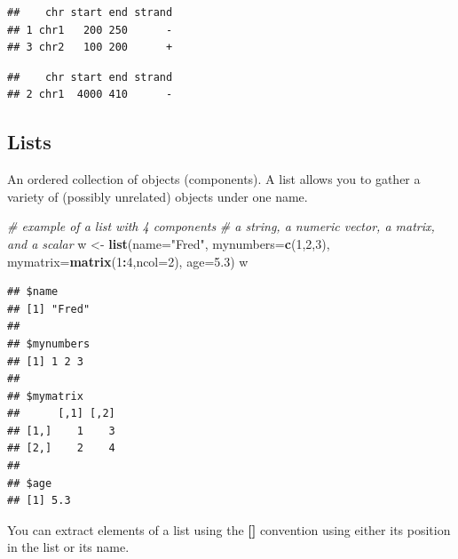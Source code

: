 \documentclass[12pt,]{krantz}
\newenvironment{Shaded}{\begin{snugshade}}{\end{snugshade}}
\newcommand{\CommentTok}[1]{\textcolor[rgb]{0.56,0.35,0.01}{\textit{#1}}}
\newcommand{\DataTypeTok}[1]{\textcolor[rgb]{0.13,0.29,0.53}{#1}}
\newcommand{\DecValTok}[1]{\textcolor[rgb]{0.00,0.00,0.81}{#1}}
\newcommand{\FloatTok}[1]{\textcolor[rgb]{0.00,0.00,0.81}{#1}}
\newcommand{\KeywordTok}[1]{\textcolor[rgb]{0.13,0.29,0.53}{\textbf{#1}}}
\newcommand{\NormalTok}[1]{#1}
\newcommand{\OperatorTok}[1]{\textcolor[rgb]{0.81,0.36,0.00}{\textbf{#1}}}
\newcommand{\StringTok}[1]{\textcolor[rgb]{0.31,0.60,0.02}{#1}}
\begin{document}
\begin{verbatim}
##    chr start end strand
## 1 chr1   200 250      -
## 3 chr2   100 200      +
\end{verbatim}

\begin{Shaded}
\end{Shaded}

\begin{verbatim}
##    chr start end strand
## 2 chr1  4000 410      -
\end{verbatim}

\hypertarget{lists}{%
\subsection{Lists}\label{lists}}

An ordered collection of objects (components). A list allows you to gather a variety of (possibly unrelated) objects under one name.

\begin{Shaded}
\begin{Highlighting}[]
\CommentTok{# example of a list with 4 components}
\CommentTok{# a string, a numeric vector, a matrix, and a scalar}
\NormalTok{w <-}\StringTok{ }\KeywordTok{list}\NormalTok{(}\DataTypeTok{name=}\StringTok{"Fred"}\NormalTok{,}
       \DataTypeTok{mynumbers=}\KeywordTok{c}\NormalTok{(}\DecValTok{1}\NormalTok{,}\DecValTok{2}\NormalTok{,}\DecValTok{3}\NormalTok{),}
       \DataTypeTok{mymatrix=}\KeywordTok{matrix}\NormalTok{(}\DecValTok{1}\OperatorTok{:}\DecValTok{4}\NormalTok{,}\DataTypeTok{ncol=}\DecValTok{2}\NormalTok{),}
       \DataTypeTok{age=}\FloatTok{5.3}\NormalTok{)}
\NormalTok{w}
\end{Highlighting}
\end{Shaded}

\begin{verbatim}
## $name
## [1] "Fred"
## 
## $mynumbers
## [1] 1 2 3
## 
## $mymatrix
##      [,1] [,2]
## [1,]    1    3
## [2,]    2    4
## 
## $age
## [1] 5.3
\end{verbatim}

You can extract elements of a list using the \textbf{{[}\protect\hyperlink{section-21}{}{]}} convention using either its position in the list or its name.
\end{document}
